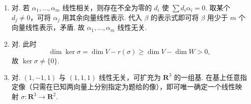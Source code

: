 \begin{enumerate}
\begin{enumerate}
        \item 对. 若 $\alpha_1,\ldots,\alpha_m$ 线性相关，则存在不全为零的 $d_i$ 使 $\sum d_i\alpha_i=0$. 取某个 $d_j\neq 0$，可将 $\alpha_j$ 用其余向量线性表示. 代入 $\beta$ 的表示式即可将 $\beta$ 用少于 $m$ 个向量线性表示，矛盾. 故 $\alpha_1,\ldots,\alpha_m$ 线性无关.

        \item 对. 此时
        \[
            \dim\ker\sigma=\dim V-r(\sigma)
            \geqslant\dim V-\dim W>0,
        \]
        故 $\ker\sigma\neq\{0\}$.

        \item 对. $(1,-1,1)$ 与 $(1,1,1)$ 线性无关，可扩充为 $\mathbf{R}^3$ 的一组基. 在基上任意指定像（只需在已知两向量上分别指定为题给的像），即可唯一确定一个线性映射 $\sigma:\mathbf{R}^3\to\mathbf{R}^2$.
    \end{enumerate}
\end{enumerate}

\clearpage

